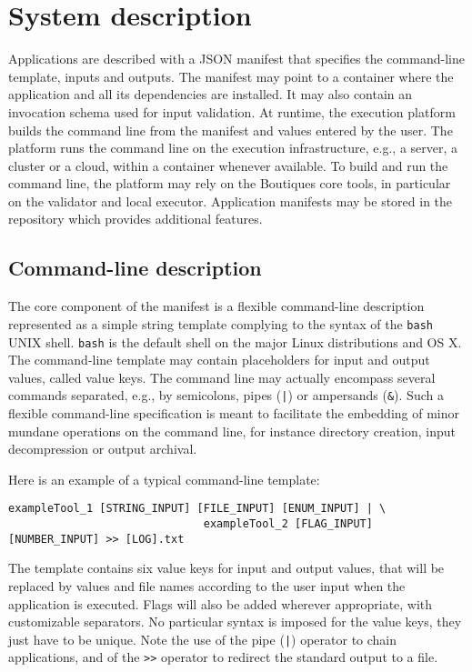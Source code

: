 \documentclass{article}
\newcommand{\note}[2]{\pdfmargincomment[color=yellow,author=#1,open=true]{#2}}
\newcommand{\boutiques}{Boutiques\xspace}
\begin{document}

\section{System description}
\label{sec:system}

Applications are described with a JSON manifest that specifies the
command-line template, inputs and outputs. The manifest may point to a
container where the application and all its dependencies are
installed. It may also contain an invocation schema used for input
validation. At runtime, the execution platform builds the command line
from the manifest and values entered by the user. The platform runs
the command line on the execution infrastructure, e.g., a server, a
cluster or a cloud, within a container whenever available. To build
and run the command line, the platform may rely on the \boutiques core
tools, in particular on the validator and local executor. Application
manifests may be stored in the repository which provides additional
features.

\subsection{Command-line description}

The core component of the manifest is a flexible command-line
description represented as a simple string template complying to the
syntax of the \texttt{bash} UNIX shell. \texttt{bash} is the default
shell on the major Linux distributions and OS X. The command-line
template may contain placeholders for input and output values, called
value keys. The command line may actually
encompass several commands separated, e.g., by semicolons, pipes
(\texttt{|}) or ampersands (\texttt{\&}). Such a flexible command-line
specification is meant to facilitate the embedding of minor mundane
operations on the command line, for instance directory creation, input
decompression or output archival.

Here is an example of a typical command-line template:
\begin{verbatim}
exampleTool_1 [STRING_INPUT] [FILE_INPUT] [ENUM_INPUT] | \
                              exampleTool_2 [FLAG_INPUT] [NUMBER_INPUT] >> [LOG].txt
\end{verbatim}
The template contains six value keys for input and output values, that
will be replaced by values and file names according to the user input
when the application is executed. Flags will also be added wherever
appropriate, with customizable separators. No particular syntax is
imposed for the value keys, they just have to be unique.  Note the use
of the pipe (\texttt{|}) operator to chain applications, and of the
\texttt{>>} operator to redirect the standard output to a file.
\end{document}
